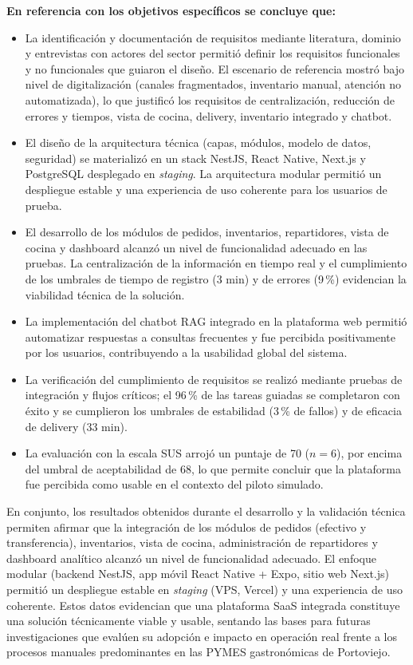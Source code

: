 \textbf{En referencia con los objetivos específicos se concluye que:} 
\begin{itemize}
    \item La identificación y documentación de requisitos mediante literatura, dominio y entrevistas con actores del sector permitió definir los requisitos funcionales y no funcionales que guiaron el diseño. El escenario de referencia mostró bajo nivel de digitalización (canales fragmentados, inventario manual, atención no automatizada), lo que justificó los requisitos de centralización, reducción de errores y tiempos, vista de cocina, delivery, inventario integrado y chatbot.

    \item  El diseño de la arquitectura técnica (capas, módulos, modelo de datos, seguridad) se materializó en un stack NestJS, React Native, Next.js y PostgreSQL desplegado en \textit{staging}. La arquitectura modular permitió un despliegue estable y una experiencia de uso coherente para los usuarios de prueba.

    \item  El desarrollo de los módulos de pedidos, inventarios, repartidores, vista de cocina y dashboard alcanzó un nivel de funcionalidad adecuado en las pruebas. La centralización de la información en tiempo real y el cumplimiento de los umbrales de tiempo de registro (3 min) y de errores (9\,\%) evidencian la viabilidad técnica de la solución.

    \item  La implementación del chatbot RAG integrado en la plataforma web permitió automatizar respuestas a consultas frecuentes y fue percibida positivamente por los usuarios, contribuyendo a la usabilidad global del sistema.

    \item  La verificación del cumplimiento de requisitos se realizó mediante pruebas de integración y flujos críticos; el 96\,\% de las tareas guiadas se completaron con éxito y se cumplieron los umbrales de estabilidad (3\,\% de fallos) y de eficacia de delivery (33 min).

    \item  La evaluación con la escala SUS arrojó un puntaje de 70 ($n = 6$), por encima del umbral de aceptabilidad de 68, lo que permite concluir que la plataforma fue percibida como usable en el contexto del piloto simulado.
\end{itemize}

En conjunto, los resultados obtenidos durante el desarrollo y la validación técnica permiten afirmar que la integración de los módulos de pedidos (efectivo y transferencia), inventarios, vista de cocina, administración de repartidores y dashboard analítico alcanzó un nivel de funcionalidad adecuado. El enfoque modular (backend NestJS, app móvil React Native + Expo, sitio web Next.js) permitió un despliegue estable en \textit{staging} (VPS, Vercel) y una experiencia de uso coherente. Estos datos evidencian que una plataforma SaaS integrada constituye una solución técnicamente viable y usable, sentando las bases para futuras investigaciones que evalúen su adopción e impacto en operación real frente a los procesos manuales predominantes en las PYMES gastronómicas de Portoviejo.

